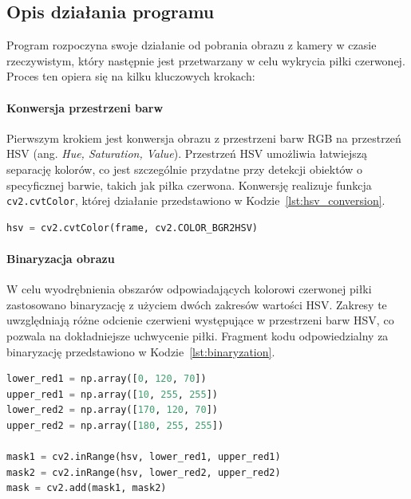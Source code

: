 \documentclass[a4paper,twoside,12pt]{book}
\begin{document}
\subsection{Opis działania programu}

Program rozpoczyna swoje działanie od pobrania obrazu z kamery w czasie rzeczywistym, który następnie jest przetwarzany w celu wykrycia piłki czerwonej. Proces ten opiera się na kilku kluczowych krokach:

\paragraph{Konwersja przestrzeni barw}
Pierwszym krokiem jest konwersja obrazu z przestrzeni barw RGB na przestrzeń HSV (ang. \textit{Hue, Saturation, Value}). Przestrzeń HSV umożliwia łatwiejszą separację kolorów, co jest szczególnie przydatne przy detekcji obiektów o specyficznej barwie, takich jak piłka czerwona. Konwersję realizuje funkcja \texttt{cv2.cvtColor}, której działanie przedstawiono w Kodzie~\ref{lst:hsv_conversion}.

\begin{lstlisting}[language=Python, caption={Konwersja obrazu z przestrzeni RGB do HSV.}, label={lst:hsv_conversion}, captionpos=b]
hsv = cv2.cvtColor(frame, cv2.COLOR_BGR2HSV)
\end{lstlisting}

\paragraph{Binaryzacja obrazu}
W celu wyodrębnienia obszarów odpowiadających kolorowi czerwonej piłki zastosowano binaryzację z użyciem dwóch zakresów wartości HSV. Zakresy te uwzględniają różne odcienie czerwieni występujące w przestrzeni barw HSV, co pozwala na dokładniejsze uchwycenie piłki. Fragment kodu odpowiedzialny za binaryzację przedstawiono w Kodzie~\ref{lst:binaryzation}.

\begin{lstlisting}[language=Python, caption={Binaryzacja obrazu w oparciu o zakresy HSV.}, label={lst:binaryzation}, captionpos=b]
lower_red1 = np.array([0, 120, 70])
upper_red1 = np.array([10, 255, 255])
lower_red2 = np.array([170, 120, 70])
upper_red2 = np.array([180, 255, 255])

mask1 = cv2.inRange(hsv, lower_red1, upper_red1)
mask2 = cv2.inRange(hsv, lower_red2, upper_red2)
mask = cv2.add(mask1, mask2)
\end{lstlisting}
\end{document}
